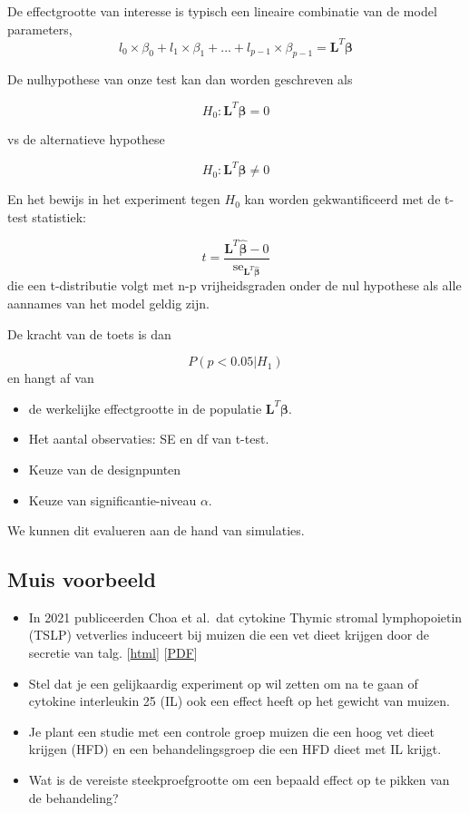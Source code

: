 \documentclass[
]{article}
\providecommand{\tightlist}{%
  \setlength{\itemsep}{0pt}\setlength{\parskip}{0pt}}
\begin{document}
De effectgrootte van interesse is typisch een lineaire combinatie van de
model parameters,\\
\[
l_0 \times \beta_0 + l_1 \times \beta_1 + ... + l_{p-1} \times \beta_{p-1} = \mathbf{L}^T\boldsymbol{\beta}
\]

De nulhypothese van onze test kan dan worden geschreven als

\[
H_0: \mathbf{L}^T\boldsymbol{\beta} = 0 
\]

vs de alternatieve hypothese

\[
H_0: \mathbf{L}^T\boldsymbol{\beta} \neq 0 
\]

En het bewijs in het experiment tegen \(H_0\) kan worden gekwantificeerd
met de t-test statistiek:

\[
t=\frac{\mathbf{L}^T\hat{\boldsymbol{\beta}} - 0}{\text{se}_{\mathbf{L}^T\hat{\boldsymbol{\beta}}}}
\] die een t-distributie volgt met n-p vrijheidsgraden onder de nul
hypothese als alle aannames van het model geldig zijn.

De kracht van de toets is dan

\[P(p < 0.05 | H_1)\] en hangt af van

\begin{itemize}
\tightlist
\item
  de werkelijke effectgrootte in de populatie
  \(\mathbf{L}^T\boldsymbol{\beta}\).
\item
  Het aantal observaties: SE en df van t-test.
\item
  Keuze van de designpunten
\item
  Keuze van significantie-niveau \(\alpha\).
\end{itemize}

We kunnen dit evalueren aan de hand van simulaties.

\hypertarget{muis-voorbeeld}{%
\subsection{Muis voorbeeld}\label{muis-voorbeeld}}

\begin{itemize}
\item
  In 2021 publiceerden Choa et al.~dat cytokine Thymic stromal
  lymphopoietin (TSLP) vetverlies induceert bij muizen die een vet dieet
  krijgen door de secretie van talg.
  {[}\href{https://www.science.org/doi/full/10.1126/science.abd2893}{html}{]}
  {[}\href{https://www.science.org/doi/pdf/10.1126/science.abd2893}{PDF}{]}
\item
  Stel dat je een gelijkaardig experiment op wil zetten om na te gaan of
  cytokine interleukin 25 (IL) ook een effect heeft op het gewicht van
  muizen.
\item
  Je plant een studie met een controle groep muizen die een hoog vet
  dieet krijgen (HFD) en een behandelingsgroep die een HFD dieet met IL
  krijgt.
\item
  Wat is de vereiste steekproefgrootte om een bepaald effect op te
  pikken van de behandeling?
\end{itemize}
\end{document}
